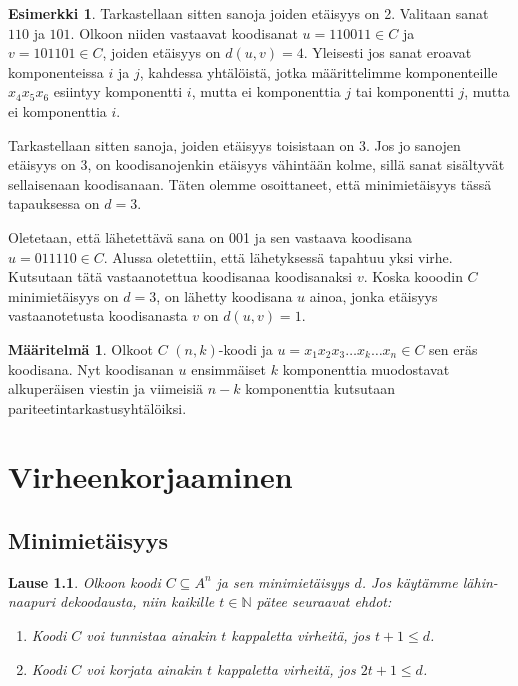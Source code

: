 \documentclass[a4paper,12pt,leqno,oneside]{report} %
\theoremstyle{plain}
\newtheorem{lause}{Lause}[chapter]
\theoremstyle{definition}
\newtheorem{maaritelma}{Määritelmä}[chapter]
\newtheorem{esimerkki}{Esimerkki}[chapter]
\theoremstyle{remark}
\numberwithin{equation}{chapter}
\newcommand*{\Nset}{\mathbb{N}}  %
\begin{document}
\begin{esimerkki}
        Tarkastellaan sitten sanoja joiden etäisyys on 2. Valitaan sanat $110$ ja $101$. Olkoon niiden vastaavat koodisanat $u = 110011 \in C$ ja $v = 101101 \in C$, joiden etäisyys on $d(u, v) = 4$. Yleisesti jos sanat eroavat komponenteissa $i$ ja $j$, kahdessa yhtälöistä, jotka määrittelimme komponenteille $x_4x_5x_6$ esiintyy komponentti $i$, mutta ei komponenttia $j$ tai komponentti $j$, mutta ei komponenttia $i$.

        Tarkastellaan sitten sanoja, joiden etäisyys toisistaan on 3. Jos jo sanojen etäisyys on 3, on koodisanojenkin etäisyys vähintään kolme, sillä sanat sisältyvät sellaisenaan koodisanaan. Täten olemme osoittaneet, että minimietäisyys tässä tapauksessa on $d = 3$.

        Oletetaan, että lähetettävä sana on 001 ja sen vastaava koodisana $u = 011110 \in C$.
        Alussa oletettiin, että lähetyksessä tapahtuu yksi virhe. Kutsutaan tätä vastaanotettua koodisanaa koodisanaksi $v$. Koska kooodin $C$ minimietäisyys on $d = 3$, on lähetty koodisana $u$ ainoa, jonka etäisyys vastaanotetusta koodisanasta $v$ on $d(u,v) = 1$.
    \end{esimerkki}

    \begin{maaritelma}\label{maar:nkkoodi}
        Olkoot $C$ $(n, k)$-koodi ja $u = x_1x_2x_3\dots x_k \dots x_n \in C$ sen eräs koodisana. Nyt koodisanan $u$ ensimmäiset $k$ komponenttia muodostavat alkuperäisen viestin ja viimeisiä $n-k$ komponenttia kutsutaan pariteetintarkastusyhtälöiksi.
    \end{maaritelma}

    \chapter{Virheenkorjaaminen}
    \section{Minimietäisyys}

    \begin{lause}\label{lause:nncorrection}
        Olkoon koodi $C \subseteq A^n$ ja sen minimietäisyys $d$. Jos käytämme lähin-naapuri dekoodausta, niin kaikille $t \in \Nset$ pätee seuraavat ehdot:
        \begin{enumerate}
            \item\label{kht:vtunnistus} Koodi $C$ voi tunnistaa ainakin $t$ kappaletta virheitä, jos $t + 1 \le d$.
            \item\label{kht:vkorjaus} Koodi $C$ voi korjata ainakin $t$ kappaletta virheitä, jos $2t + 1 \le d$.
        \end{enumerate}
    \end{lause}
\end{document}
